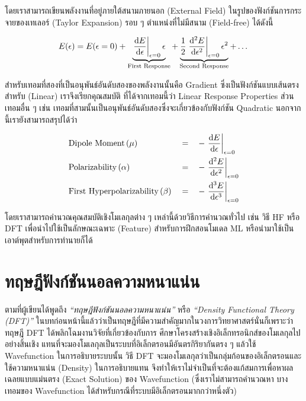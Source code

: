 โดยเราสามารถเขียนพลังงานที่อยู่ภายใต้สนามภายนอก (External Field) ในรูปของฟังก์ชันการกระจายของเทเลอร์ (Taylor Expansion)
รอบ ๆ ตำแหน่งที่ไม่มีสนาม (Field-free) ได้ดังนี้

\begin{equation}\label{eq:ener_taylor}
    E(\epsilon) = E(\epsilon = 0)
    + \underbrace{\evaluated{\dv{E}{\epsilon}}_{\epsilon = 0} \epsilon}_{%
        \text{First Response}}
    + \underbrace{\frac{1}{2} \evaluated{\dv[2]{E}{\epsilon}}_{\epsilon = 0} \epsilon^{2}}_{%
        \text{Second Response}}
    + \dots
\end{equation}

\noindent สำหรับเทอมที่สองที่เป็นอนุพันธ์อันดับสองของพลังงานนั้นคือ Gradient ซึ่งเป็นฟังก์ชันแบบเส้นตรงสำหรับ (Linear) เราจึงเรียกคุณสมบัติ%
ที่ได้จากเทอมนี้ว่า Linear Response Properties ส่วนเทอมอื่น ๆ เช่น เทอมที่สามนั้นเป็นอนุพันธ์อันดับสองซึ่งจะเกี่ยวข้องกับฟังก์ชัน Quadratic
นอกจากนี้เรายังสามารถสรุปได้ว่า

\begin{framed}
    \begin{align*}
         & \text{Dipole Moment}\,(\mu)               &  & = &  & -\evaluated{\dv{E}{\epsilon}}_{\epsilon = 0}    \\
         & \text{Polarizability}\,(\alpha)           &  & = &  & -\evaluated{\dv[2]{E}{\epsilon}}_{\epsilon = 0} \\
         & \text{First Hyperpolarizability}\,(\beta) &  & = &  & -\evaluated{\dv[3]{E}{\epsilon}}_{\epsilon = 0}
    \end{align*}
\end{framed}

โดยเราสามารถคำนวณคุณสมบัติเชิงโมเลกุลต่าง ๆ เหล่านี้ด้วยวิธีการคำนวณทั่วไป เช่น วิธี HF หรือ DFT เพื่อนำไปใช้เป็นลักษณะเฉพาะ (Feature)
สำหรับการฝึกสอนโมเดล ML หรือนำมาใช้เป็นเอาต์พุตสำหรับการทำนายก็ได้

\section{ทฤษฎีฟังก์ชันนอลความหนาแน่น}
\label{sec:dft}

ตามที่ผู้เขียนได้พูดถึง \textit{\enquote{ทฤษฎีฟังก์ชันนอลความหนาแน่น}} หรือ \textit{\enquote{Density Functional Theory
        (DFT)}} ในบทก่อนหน้านี้แล้วว่าเป็นทฤษฎีที่มีความสำคัญมากในวงการวิทยาศาสตร์นั่นก็เพราะว่าทฤษฎี DFT ได้พลิกโฉมงานวิจัยที่เกี่ยวข้องกับการ%
ศึกษาโครงสร้างเชิงอิเล็กทรอนิกส์ของโมเลกุลไปอย่างสิ้นเชิง แทนที่จะมองโมเลกุลเป็นระบบที่อิเล็กตรอนมีอันตรกิริยากันตรง ๆ แล้วใช้
Wavefunction ในการอธิบายระบบนั้น วิธี DFT จะมองโมเลกุลว่าเป็นกลุ่มก้อนของอิเล็กตรอนและใช้ความหนาแน่น (Density) ในการอธิบายแทน
จึงทำให้เราไม่จำเป็นที่จะต้องแก้สมการเพื่อหาผลเฉลยแบบแม่นตรง (Exact Solution) ของ Wavefunction (ซึ่งเราไม่สามารถคำนวณหา%
บางเทอมของ Wavefunction ได้สำหรับกรณีที่ระบบมีอิเล็กตรอนมากกว่าหนึ่งตัว)

